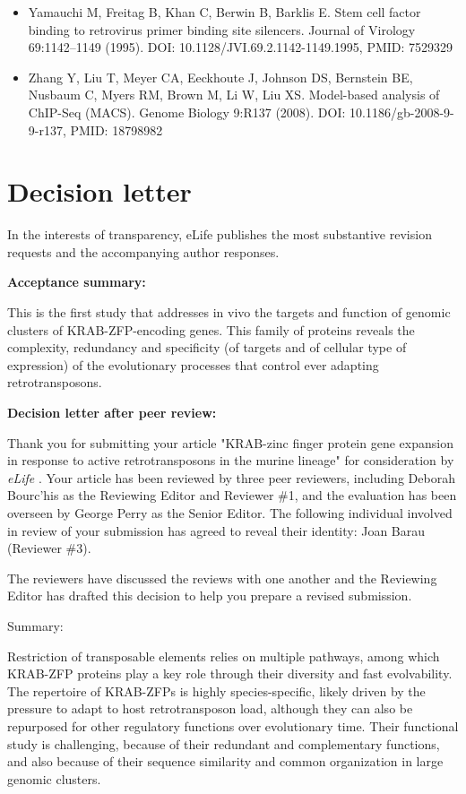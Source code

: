 \documentclass[11pt,a4paper]{article}
\begin{document}
\begin{itemize}
\item Yamauchi M, Freitag B, Khan C, Berwin B, Barklis E. Stem cell factor binding to retrovirus primer binding site silencers. Journal of Virology 69:1142–1149 (1995). DOI: 10.1128/JVI.69.2.1142-1149.1995, PMID: 7529329
\item Zhang Y, Liu T, Meyer CA, Eeckhoute J, Johnson DS, Bernstein BE, Nusbaum C, Myers RM, Brown M, Li W, Liu XS. Model-based analysis of ChIP-Seq (MACS). Genome Biology 9:R137 (2008). DOI: 10.1186/gb-2008-9-9-r137, PMID: 18798982
\end{itemize}

\section{Decision letter}

In the interests of transparency, eLife publishes the most substantive revision requests and the accompanying author responses.

\textbf{Acceptance summary:}

This is the first study that addresses in vivo the targets and function of genomic clusters of KRAB-ZFP-encoding genes. This family of proteins reveals the complexity, redundancy and specificity (of targets and of cellular type of expression) of the evolutionary processes that control ever adapting retrotransposons.

\textbf{Decision letter after peer review:}

Thank you for submitting your article "KRAB-zinc finger protein gene expansion in response to active retrotransposons in the murine lineage" for consideration by \textit{eLife} . Your article has been reviewed by three peer reviewers, including Deborah Bourc'his as the Reviewing Editor and Reviewer \#1, and the evaluation has been overseen by George Perry as the Senior Editor. The following individual involved in review of your submission has agreed to reveal their identity: Joan Barau (Reviewer \#3).

The reviewers have discussed the reviews with one another and the Reviewing Editor has drafted this decision to help you prepare a revised submission.

Summary:

Restriction of transposable elements relies on multiple pathways, among which KRAB-ZFP proteins play a key role through their diversity and fast evolvability. The repertoire of KRAB-ZFPs is highly species-specific, likely driven by the pressure to adapt to host retrotransposon load, although they can also be repurposed for other regulatory functions over evolutionary time. Their functional study is challenging, because of their redundant and complementary functions, and also because of their sequence similarity and common organization in large genomic clusters.
\end{document}
